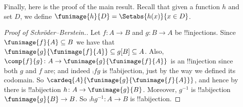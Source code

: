\documentclass[../../../include/open-logic-section]{subfiles}
\begin{document}
Finally, here is the proof of the main result. Recall that given a function $h$ and set $D$, we define $\funimage{h}{D} = \Setabs{h(x)}{x \in D}$. 
\begin{proof}[Proof of Schr\"oder--Berstein.]
	Let $f \colon A \to B$ and $g \colon B \to A$ be !!{injection}s. Since $\funimage{f}{A} \subseteq B$ we have that $\funimage{g}{\funimage{f}{A}} \subseteq g[B] \subseteq A$. Also, $\comp{f}{g} \colon A \to \funimage{g}{\funimage{f}{A}}$ is an !!{injection} since both $g$ and $f$ are; and indeed $\comp{f}{g}$ is !!a{bijection}, just by the way we defined its codomain. So $\cardeq{A}{\funimage{g}{\funimage{f}{A}}}$, and hence by  there is !!a{bijection} $h \colon A \to \funimage{g}{B}$. Moreover, $g^{-1}$ is !!a{bijection} $\funimage{g}{B} \to B$. So $\comp{h}{g^{-1}} \colon A \to B$ is !!a{bijection}. 
\end{proof}
\end{document}
